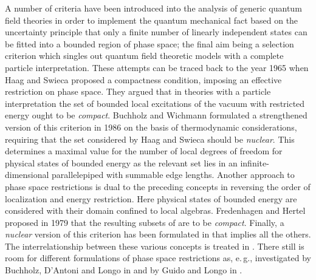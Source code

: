 \documentclass[a4paper,a4paper]{article}
\numberwithin{equation}{section}
\providecommand{\AO}{\mathfrak{A} ( \mathscr{O} )}
\theoremstyle{definition}
\theoremstyle{plain}
\theoremstyle{remark}
\theoremstyle{assumption}
\begin{document}
  A number of criteria have been introduced into the analysis of
  generic quantum field theories in order to implement the quantum
  mechanical fact based on the uncertainty principle that only a
  finite number of linearly independent states can be fitted into a
  bounded region of phase space; the final aim being a selection
  criterion which singles out quantum field theoretic models with a
  complete particle interpretation. These attempts can be traced back
  to the year 1965 when Haag and Swieca \cite{haag/swieca:1965}
  proposed a compactness condition, imposing an effective restriction
  on phase space. They argued that in theories with a particle
  interpretation the set of bounded local excitations of the vacuum
  with restricted energy ought to be \emph{compact}. Buchholz and
  Wichmann \cite{buchholz/wichmann:1986} formulated a strengthened
  version of this criterion in 1986 on the basis of thermodynamic
  considerations, requiring that the set considered by Haag and Swieca
  should be \emph{nuclear}. This determines a maximal value for the
  number of local degrees of freedom for physical states of bounded
  energy as the relevant set lies in an infinite-dimensional
  parallelepiped with summable edge lengths. Another approach to phase
  space restrictions is dual to the preceding concepts in reversing
  the order of localization and energy restriction. Here physical
  states of bounded energy are considered with their domain confined
  to local algebras. Fredenhagen and Hertel
  \cite{fredenhagen/hertel:1979} proposed in 1979 that the resulting
  subsets of \myHighlight{$\AO^*$}\coordHE{} are to be \emph{compact}. Finally, a
  \emph{nuclear} version of this criterion has been formulated in
  \cite{porrmann:1988} that implies all the others. The
  interrelationship between these various concepts is treated in
  \cite{buchholz/porrmann:1990}. There still is room for different
  formulations of phase space restrictions as, e.\,g., investigated
  by Buchholz, D'Antoni and Longo in
  \cite{buchholz/dantoni/longo:1990} and by Guido and Longo in
  \cite{guido/longo:2001}.
  
\end{document}
